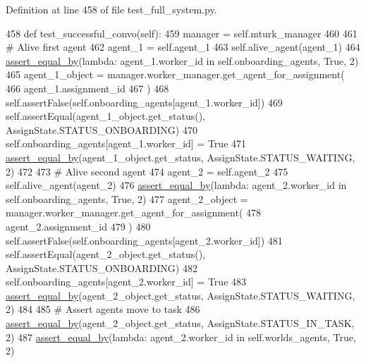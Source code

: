 Definition at line 458 of file test\+\_\+full\+\_\+system.\+py.


\begin{DoxyCode}
458     \textcolor{keyword}{def }test\_successful\_convo(self):
459         manager = self.mturk\_manager
460 
461         \textcolor{comment}{# Alive first agent}
462         agent\_1 = self.agent\_1
463         self.alive\_agent(agent\_1)
464         \hyperlink{namespaceparlai_1_1mturk_1_1core_1_1test_1_1test__full__system_a0b463246d35658a2e422010f13dcf819}{assert\_equal\_by}(\textcolor{keyword}{lambda}: agent\_1.worker\_id \textcolor{keywordflow}{in} self.onboarding\_agents, \textcolor{keyword}{True}, 2)
465         agent\_1\_object = manager.worker\_manager.get\_agent\_for\_assignment(
466             agent\_1.assignment\_id
467         )
468         self.assertFalse(self.onboarding\_agents[agent\_1.worker\_id])
469         self.assertEqual(agent\_1\_object.get\_status(), AssignState.STATUS\_ONBOARDING)
470         self.onboarding\_agents[agent\_1.worker\_id] = \textcolor{keyword}{True}
471         \hyperlink{namespaceparlai_1_1mturk_1_1core_1_1test_1_1test__full__system_a0b463246d35658a2e422010f13dcf819}{assert\_equal\_by}(agent\_1\_object.get\_status, AssignState.STATUS\_WAITING, 2)
472 
473         \textcolor{comment}{# Alive second agent}
474         agent\_2 = self.agent\_2
475         self.alive\_agent(agent\_2)
476         \hyperlink{namespaceparlai_1_1mturk_1_1core_1_1test_1_1test__full__system_a0b463246d35658a2e422010f13dcf819}{assert\_equal\_by}(\textcolor{keyword}{lambda}: agent\_2.worker\_id \textcolor{keywordflow}{in} self.onboarding\_agents, \textcolor{keyword}{True}, 2)
477         agent\_2\_object = manager.worker\_manager.get\_agent\_for\_assignment(
478             agent\_2.assignment\_id
479         )
480         self.assertFalse(self.onboarding\_agents[agent\_2.worker\_id])
481         self.assertEqual(agent\_2\_object.get\_status(), AssignState.STATUS\_ONBOARDING)
482         self.onboarding\_agents[agent\_2.worker\_id] = \textcolor{keyword}{True}
483         \hyperlink{namespaceparlai_1_1mturk_1_1core_1_1test_1_1test__full__system_a0b463246d35658a2e422010f13dcf819}{assert\_equal\_by}(agent\_2\_object.get\_status, AssignState.STATUS\_WAITING, 2)
484 
485         \textcolor{comment}{# Assert agents move to task}
486         \hyperlink{namespaceparlai_1_1mturk_1_1core_1_1test_1_1test__full__system_a0b463246d35658a2e422010f13dcf819}{assert\_equal\_by}(agent\_2\_object.get\_status, AssignState.STATUS\_IN\_TASK, 2)
487         \hyperlink{namespaceparlai_1_1mturk_1_1core_1_1test_1_1test__full__system_a0b463246d35658a2e422010f13dcf819}{assert\_equal\_by}(\textcolor{keyword}{lambda}: agent\_2.worker\_id \textcolor{keywordflow}{in} self.worlds\_agents, \textcolor{keyword}{True}, 2)

\end{DoxyCode}
